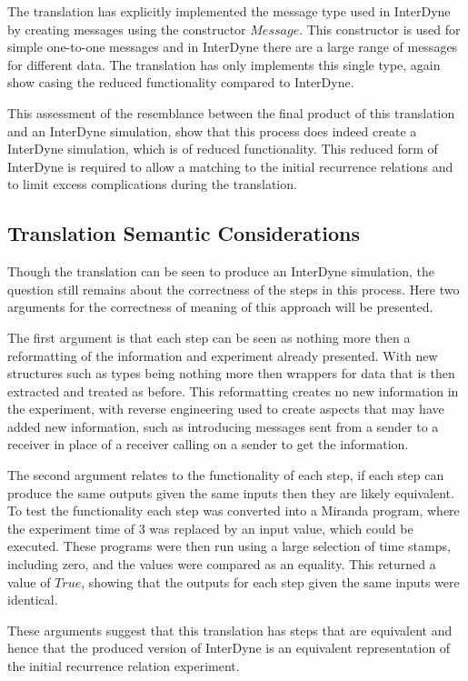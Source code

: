\documentclass{article}
\begin{document}
The translation has explicitly implemented the message type used in InterDyne by creating messages using the constructor $Message$. This constructor is used for simple one-to-one messages and in InterDyne there are a large range of messages for different data. The translation has only implements this single type, again show casing the reduced functionality compared to InterDyne.   

This assessment of the resemblance between the final product of this translation and an InterDyne simulation, show that this process does indeed create a InterDyne simulation, which is of reduced functionality. This reduced form of InterDyne is required to allow a matching to the initial recurrence relations and to limit excess complications during the translation.



\subsection{Translation Semantic Considerations} %
Though the translation can be seen to produce an InterDyne simulation, the question still remains about the correctness of the steps in this process. Here two arguments for the correctness of meaning of this approach will be presented.  

The first argument is that each step can be seen as nothing more then a reformatting of the information and experiment already presented. With new structures such as types being nothing more then wrappers for data that is then extracted and treated as before. This reformatting creates no new information in the experiment, with reverse engineering used to create aspects that may have added new information, such as introducing messages sent from a sender to a receiver in place of a receiver calling on a sender to get the information.   

The second argument relates to the functionality of each step, if each step can produce the same outputs given the same inputs then they are likely equivalent. To test the functionality each step was converted into a Miranda program, where the experiment time of $3$ was replaced by an input value, which could be executed. These programs were then run using a large selection of time stamps, including zero, and the values were compared as an equality. This returned a value of $True$, showing that the outputs for each step given the same inputs were identical. 

These arguments suggest that this translation has steps that are equivalent and hence that the produced version of InterDyne is an equivalent representation of the initial recurrence relation experiment. 
\end{document}
